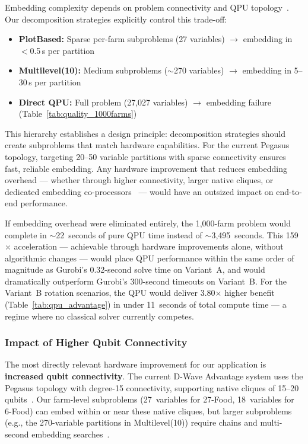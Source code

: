 Embedding complexity depends on problem connectivity and QPU topology~\cite{choi2008minor, zbinden2020embedding}. Our decomposition strategies explicitly control this trade-off:
\begin{itemize}
    \item \textbf{PlotBased:} Sparse per-farm subproblems (27 variables) $\to$ embedding in $<$0.5\,s per partition
    \item \textbf{Multilevel(10):} Medium subproblems ($\sim$270 variables) $\to$ embedding in 5--30\,s per partition
    \item \textbf{Direct QPU:} Full problem (27,027 variables) $\to$ embedding failure (Table~\ref{tab:quality_1000farms})
\end{itemize}

This hierarchy establishes a design principle: decomposition strategies should create subproblems that match hardware capabilities. For the current Pegasus topology, targeting 20--50 variable partitions with sparse connectivity ensures fast, reliable embedding. Any hardware improvement that reduces embedding overhead --- whether through higher connectivity, larger native cliques, or dedicated embedding co-processors~\cite{boothby2021zephyr} --- would have an outsized impact on end-to-end performance.

If embedding overhead were eliminated entirely, the 1,000-farm problem would complete in $\sim$22~seconds of pure QPU time instead of $\sim$3,495~seconds. This 159$\times$ acceleration --- achievable through hardware improvements alone, without algorithmic changes --- would place QPU performance within the same order of magnitude as Gurobi's 0.32-second solve time on Variant~A, and would dramatically outperform Gurobi's 300-second timeouts on Variant~B. For the Variant~B rotation scenarios, the QPU would deliver 3.80$\times$ higher benefit (Table~\ref{tab:qpu_advantage}) in under 11~seconds of total compute time --- a regime where no classical solver currently competes.

\subsubsection{Impact of Higher Qubit Connectivity}

The most directly relevant hardware improvement for our application is \textbf{increased qubit connectivity}. The current D-Wave Advantage system uses the Pegasus topology with degree-15 connectivity, supporting native cliques of 15--20 qubits~\cite{boothby2020next}. Our farm-level subproblems (27~variables for 27-Food, 18~variables for 6-Food) can embed within or near these native cliques, but larger subproblems (e.g., the 270-variable partitions in Multilevel(10)) require chains and multi-second embedding searches~\cite{cai2014practical}.

